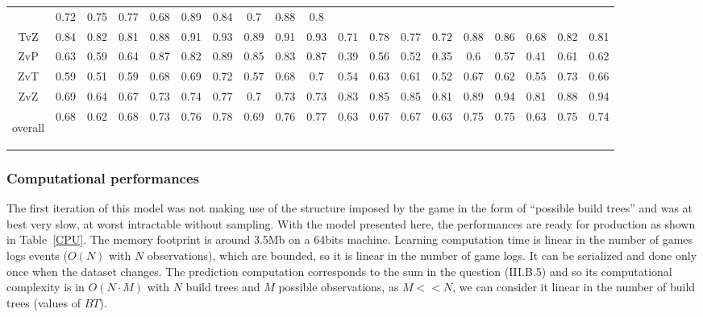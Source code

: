 \begin{table}
\begin{center}
\begin{tabular}{|c|ccc|ccc|ccc|ccc|ccc|ccc|}
& 0.72 & 0.75 & 0.77 & 0.68 & 0.89 & 0.84 & 0.7 & 0.88 & 0.8 \\
TvZ & 0.84 & 0.82 & 0.81 & 0.88 & 0.91 & 0.93 & 0.89 & 0.91 & 0.93
& 0.71 & 0.78 & 0.77 & 0.72 & 0.88 & 0.86 & 0.68 & 0.82 & 0.81 \\
ZvP & 0.63 & 0.59 & 0.64 & 0.87 & 0.82 & 0.89 & 0.85 & 0.83 & 0.87
& 0.39 & 0.56 & 0.52 & 0.35 & 0.6 & 0.57 & 0.41 & 0.61 & 0.62 \\
ZvT & 0.59 & 0.51 & 0.59 & 0.68 & 0.69 & 0.72 & 0.57 & 0.68 & 0.7
& 0.54 & 0.63 & 0.61 & 0.52 & 0.67 & 0.62 & 0.55 & 0.73 & 0.66 \\
ZvZ & 0.69 & 0.64 & 0.67 & 0.73 & 0.74 & 0.77 & 0.7 & 0.73 & 0.73
& 0.83 & 0.85 & 0.85 & 0.81 & 0.89 & 0.94 & 0.81 &  0.88 & 0.94\\ \hline
\begin{scriptsize}overall\end{scriptsize} & 0.68 & 0.62 & 0.68 & 0.73 & 0.76 & 0.78 & 0.69 & 0.76 & 0.77 
& 0.63 & 0.67 & 0.67 & 0.63 & 0.75 & 0.75 & 0.63 & 0.75 & 0.74 \\ \hline
\end{tabular}
\label{tab:openingsresults}
\end{center}
\end{table}


\subsubsection{Computational performances}
The first iteration of this model was not making use of the structure imposed by the game in the form of ``possible build trees'' and was at best very slow, at worst intractable without sampling. With the model presented here, the performances are ready for production as shown in Table~\ref{CPU}. The memory footprint is around 3.5Mb on a 64bits machine. Learning computation time is linear in the number of games logs events ($O(N)$ with $N$ observations), which are bounded, so it is linear in the number of game logs. It can be serialized and done only once when the dataset changes. The prediction computation corresponds to the sum in the question (III.B.5) and so its computational complexity is in $O(N\cdot M)$ with $N$ build trees and $M$ possible observations, as $M << N$, we can consider it linear in the number of build trees (values of $BT$).

